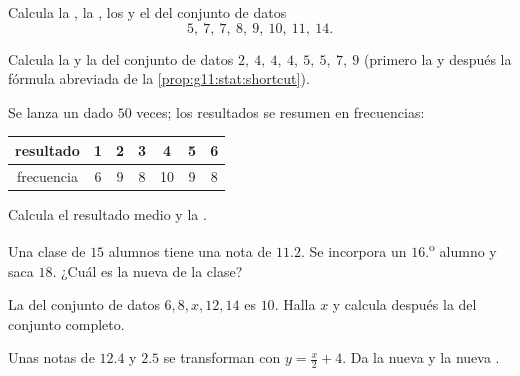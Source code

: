 \begin{exercise}[$\star$]\label{exo:g11:stat:1}
Calcula la , la , los  y el 
del conjunto de datos
\[
5,\ 7,\ 7,\ 8,\ 9,\ 10,\ 11,\ 14 .
\]
\end{exercise}

\begin{exercise}[$\star$]\label{exo:g11:stat:2}
Calcula la  y la  del conjunto de datos
$2,\ 4,\ 4,\ 4,\ 5,\ 5,\ 7,\ 9$ (primero la  y después la fórmula
abreviada de la \cref{prop:g11:stat:shortcut}).
\end{exercise}

\begin{exercise}[$\star$]\label{exo:g11:stat:3}
Se lanza un dado $50$ veces; los resultados se resumen en frecuencias:
\begin{center}
\begin{tabular}{c|cccccc}
resultado & 1 & 2 & 3 & 4 & 5 & 6\\
\hline
frecuencia & 6 & 9 & 8 & 10 & 9 & 8
\end{tabular}
\end{center}
Calcula el resultado medio y la .
\end{exercise}

\begin{exercise}[$\star\star$]\label{exo:g11:stat:4}
Una clase de $15$ alumnos tiene una nota  de $11.2$. Se incorpora un
$16$.\textsuperscript{o} alumno y saca $18$. ¿Cuál es la nueva  de la
clase?
\end{exercise}

\begin{exercise}[$\star\star$]\label{exo:g11:stat:5}
La  del conjunto de datos $6, 8, x, 12, 14$ es $10$. Halla $x$ y
calcula después la  del conjunto completo.
\end{exercise}

\begin{exercise}[$\star$]\label{exo:g11:stat:6}
Unas notas de  $12.4$ y  $2.5$ se transforman con
$y = \frac{x}{2} + 4$. Da la nueva  y la nueva .
\end{exercise}

